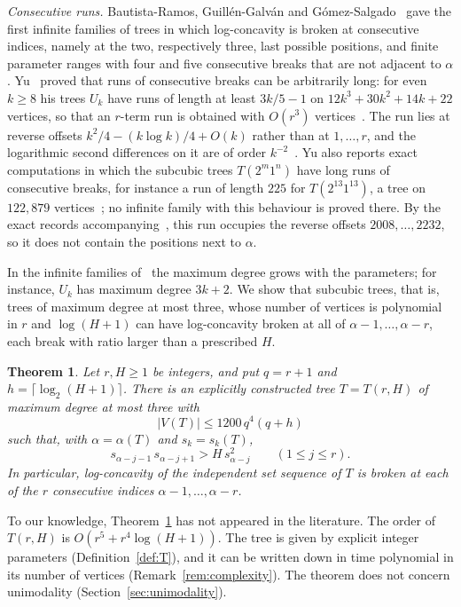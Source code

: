 \documentclass[11pt]{amsart}
\newtheorem{theorem}{Theorem}[section]
\theoremstyle{definition}
\theoremstyle{remark}
\numberwithin{equation}{section}
\begin{document}
\smallskip
\noindent\emph{Consecutive runs.} Bautista-Ramos, Guill\'en-Galv\'an and G\'omez-Salgado~\cite[Corollaries~4.13 and~4.14]{BGG} gave the first infinite families of trees in which log-concavity is broken at consecutive indices, namely at the two, respectively three, last possible positions, and finite parameter ranges with four and five consecutive breaks that are not adjacent to $\alpha$. Yu~\cite[Theorem~1.2]{Yu} proved that runs of consecutive breaks can be arbitrarily long: for even $k\ge8$ his trees $U_k$ have runs of length at least $3k/5-1$ on $12k^3+30k^2+14k+22$ vertices, so that an $r$-term run is obtained with $O(r^3)$ vertices~\cite[Corollary~1.3]{Yu}. The run lies at reverse offsets $k^2/4-(k\log k)/4+O(k)$ rather than at $1,\dots,r$, and the logarithmic second differences on it are of order $k^{-2}$~\cite[Lemma~4.1, Lemma~6.2 and Section~7]{Yu}. Yu also reports exact computations in which the subcubic trees $T(2^m1^n)$ have long runs of consecutive breaks, for instance a run of length $225$ for $T(2^{13}1^{13})$, a tree on $122{,}879$ vertices~\cite[Section~1 and Table~3]{Yu}; no infinite family with this behaviour is proved there. By the exact records accompanying~\cite{Yu}, this run occupies the reverse offsets $2008,\dots,2232$, so it does not contain the positions next to $\alpha$.

\smallskip
In the infinite families of~\cite{BR1,BGG,Gal,Yu} the maximum degree grows with the parameters; for instance, $U_k$ has maximum degree $3k+2$. We show that subcubic trees, that is, trees of maximum degree at most three, whose number of vertices is polynomial in $r$ and $\log(H+1)$ can have log-concavity broken at all of $\alpha-1,\dots,\alpha-r$, each break with ratio larger than a prescribed $H$.

\begin{theorem}\label{thm:main}
Let $r,H\ge1$ be integers, and put $q=r+1$ and $h=\lceil\log_2(H+1)\rceil$. There is an explicitly constructed tree $T=T(r,H)$ of maximum degree at most three with
\[
|V(T)|\le 1200\,q^4(q+h)
\]
such that, with $\alpha=\alpha(T)$ and $s_k=s_k(T)$,
\begin{equation}\label{eq:main}
s_{\alpha-j-1}\,s_{\alpha-j+1}>H\,s_{\alpha-j}^2\qquad(1\le j\le r).
\end{equation}
In particular, log-concavity of the independent set sequence of $T$ is broken at each of the $r$ consecutive indices $\alpha-1,\dots,\alpha-r$.
\end{theorem}

To our knowledge, Theorem~\ref{thm:main} has not appeared in the literature. The order of $T(r,H)$ is $O(r^5+r^4\log(H+1))$. The tree is given by explicit integer parameters (Definition~\ref{def:T}), and it can be written down in time polynomial in its number of vertices (Remark~\ref{rem:complexity}). The theorem does not concern unimodality (Section~\ref{sec:unimodality}).
\end{document}
